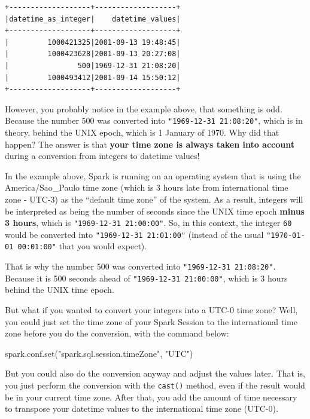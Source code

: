 \documentclass[
  11pt,
  letterpaper,
  DIV=11,
  numbers=noendperiod]{scrreprt}
\newenvironment{Shaded}{\begin{snugshade}}{\end{snugshade}}
\newcommand{\BuiltInTok}[1]{\textcolor[rgb]{0.00,0.23,0.31}{#1}}
\newcommand{\NormalTok}[1]{\textcolor[rgb]{0.00,0.23,0.31}{#1}}
\newcommand{\StringTok}[1]{\textcolor[rgb]{0.13,0.47,0.30}{#1}}
\begin{document}
\begin{verbatim}
+-------------------+-------------------+
|datetime_as_integer|    datetime_values|
+-------------------+-------------------+
|         1000421325|2001-09-13 19:48:45|
|         1000423628|2001-09-13 20:27:08|
|                500|1969-12-31 21:08:20|
|         1000493412|2001-09-14 15:50:12|
+-------------------+-------------------+
\end{verbatim}

However, you probably notice in the example above, that something is
odd. Because the number 500 was converted into
\texttt{"1969-12-31\ 21:08:20"}, which is in theory, behind the UNIX
epoch, which is 1 January of 1970. Why did that happen? The answer is
that \textbf{your time zone is always taken into account} during a
conversion from integers to datetime values!

In the example above, Spark is running on an operating system that is
using the America/Sao\_Paulo time zone (which is 3 hours late from
international time zone - UTC-3) as the ``default time zone'' of the
system. As a result, integers will be interpreted as being the number of
seconds since the UNIX time epoch \textbf{minus 3 hours}, which is
\texttt{"1969-12-31\ 21:00:00"}. So, in this context, the integer
\texttt{60} would be converted into \texttt{"1969-12-31\ 21:01:00"}
(instead of the usual \texttt{"1970-01-01\ 00:01:00"} that you would
expect).

That is why the number 500 was converted into
\texttt{"1969-12-31\ 21:08:20"}. Because it is 500 seconds ahead of
\texttt{"1969-12-31\ 21:00:00"}, which is 3 hours behind the UNIX time
epoch.

But what if you wanted to convert your integers into a UTC-0 time zone?
Well, you could just set the time zone of your Spark Session to the
international time zone before you do the conversion, with the command
below:

\begin{Shaded}
\begin{Highlighting}[]
\NormalTok{spark.conf.}\BuiltInTok{set}\NormalTok{(}\StringTok{"spark.sql.session.timeZone"}\NormalTok{, }\StringTok{"UTC"}\NormalTok{)}
\end{Highlighting}
\end{Shaded}

But you could also do the conversion anyway and adjust the values later.
That is, you just perform the conversion with the \texttt{cast()}
method, even if the result would be in your current time zone. After
that, you add the amount of time necessary to transpose your datetime
values to the international time zone (UTC-0).
\end{document}
